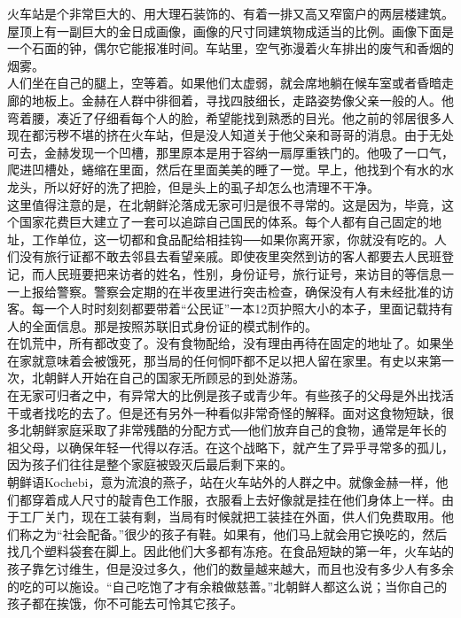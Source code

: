 火车站是个非常巨大的、用大理石装饰的、有着一排又高又窄窗户的两层楼建筑。屋顶上有一副巨大的金日成画像，画像的尺寸同建筑物成适当的比例。画像下面是一个石面的钟，偶尔它能报准时间。车站里，空气弥漫着火车排出的废气和香烟的烟雾。\\

人们坐在自己的腿上，空等着。如果他们太虚弱，就会席地躺在候车室或者昏暗走廊的地板上。金赫在人群中徘徊着，寻找四肢细长，走路姿势像父亲一般的人。他弯着腰，凑近了仔细看每个人的脸，希望能找到熟悉的目光。他之前的邻居很多人现在都污秽不堪的挤在火车站，但是没人知道关于他父亲和哥哥的消息。由于无处可去，金赫发现一个凹槽，那里原本是用于容纳一扇厚重铁门的。他吸了一口气，爬进凹槽处，蜷缩在里面，然后在里面美美的睡了一觉。早上，他找到个有水的水龙头，所以好好的洗了把脸，但是头上的虱子却怎么也清理不干净。\\

这里值得注意的是，在北朝鲜沦落成无家可归是很不寻常的。这是因为，毕竟，这个国家花费巨大建立了一套可以追踪自己国民的体系。每个人都有自己固定的地址，工作单位，这一切都和食品配给相挂钩──如果你离开家，你就没有吃的。人们没有旅行证都不敢去邻县去看望亲戚。即使夜里突然到访的客人都要去人民班登记，而人民班要把来访者的姓名，性别，身份证号，旅行证号，来访目的等信息一一上报给警察。警察会定期的在半夜里进行突击检查，确保没有人有未经批准的访客。每一个人时时刻刻都要带着“公民证”一本12页护照大小的本子，里面记载持有人的全面信息。那是按照苏联旧式身份证的模式制作的。\\

在饥荒中，所有都改变了。没有食物配给，没有理由再待在固定的地址了。如果坐在家就意味着会被饿死，那当局的任何恫吓都不足以把人留在家里。有史以来第一次，北朝鲜人开始在自己的国家无所顾忌的到处游荡。\\

在无家可归者之中，有异常大的比例是孩子或青少年。有些孩子的父母是外出找活干或者找吃的去了。但是还有另外一种看似非常奇怪的解释。面对这食物短缺，很多北朝鲜家庭采取了非常残酷的分配方式──他们放弃自己的食物，通常是年长的祖父母，以确保年轻一代得以存活。在这个战略下，就产生了异乎寻常多的孤儿，因为孩子们往往是整个家庭被毁灭后最后剩下来的。\\

朝鲜语Kochebi，意为流浪的燕子，站在火车站外的人群之中。就像金赫一样，他们都穿着成人尺寸的靛青色工作服，衣服看上去好像就是挂在他们身体上一样。由于工厂关门，现在工装有剩，当局有时候就把工装挂在外面，供人们免费取用。他们称之为“社会配备。”很少的孩子有鞋。如果有，他们马上就会用它换吃的，然后找几个塑料袋套在脚上。因此他们大多都有冻疮。在食品短缺的第一年，火车站的孩子靠乞讨维生，但是没过多久，他们的数量越来越大，而且也没有多少人有多余的吃的可以施设。“自己吃饱了才有余粮做慈善。”北朝鲜人都这么说；当你自己的孩子都在挨饿，你不可能去可怜其它孩子。\\

